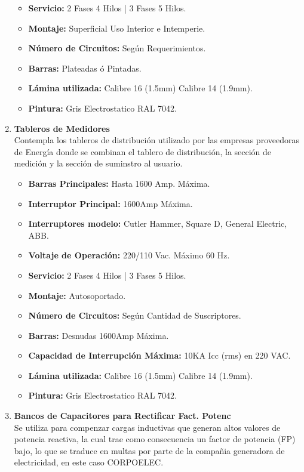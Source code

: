 \documentclass[11pt,letterpaper]{article}
\begin{document}
\begin{enumerate}
\begin{itemize}
			\item \textbf{Servicio:} 2 Fases 4 Hilos | 3 Fases 5 Hilos.
			\item \textbf{Montaje:} Superficial Uso Interior e Intemperie.
			\item \textbf{Número de Circuitos:} Según Requerimientos.
			\item \textbf{Barras:} Plateadas ó Pintadas.
			\item \textbf{Lámina utilizada:} Calibre 16 (1.5mm) Calibre 14 (1.9mm).
			\item \textbf{Pintura:} Gris Electrostatico RAL 7042.
		\end{itemize}
	\item \textbf{Tableros de Medidores}\\
		Contempla los tableros de distribución utilizado por las empresas proveedoras de Energía donde se combinan el tablero de distribución, la sección de medición y la sección de suminstro al usuario.
		\begin{itemize}
			\item \textbf{Barras Principales:} Hasta 1600 Amp. Máxima.
			\item \textbf{Interruptor Principal:} 1600Amp Máxima.
			\item \textbf{Interruptores modelo:} Cutler Hammer, Square D, General Electric, ABB.
			\item \textbf{Voltaje de Operación:} 220/110 Vac. Máximo 60 Hz.
			\item \textbf{Servicio:} 2 Fases 4 Hilos | 3 Fases 5 Hilos.
			\item \textbf{Montaje:} Autosoportado.
			\item \textbf{Número de Circuitos:} Según Cantidad de Suscriptores.
			\item \textbf{Barras:} Desnudas 1600Amp Máxima.
			\item \textbf{Capacidad de Interrupción Máxima:} 10KA Icc (rms) en 220 VAC.
			\item \textbf{Lámina utilizada:} Calibre 16 (1.5mm) Calibre 14 (1.9mm).
			\item \textbf{Pintura:} Gris Electrostatico RAL 7042.
		\end{itemize}
		
	\item \textbf{Bancos de Capacitores para Rectificar Fact. Potenc}\\
		Se utiliza para compenzar cargas inductivas que generan altos valores de potencia reactiva, la cual trae como consecuencia un factor de potencia (FP) bajo, lo que se traduce en multas por parte de la compañia generadora de electricidad, en este caso CORPOELEC.\\
		

\end{enumerate}
\end{document}
